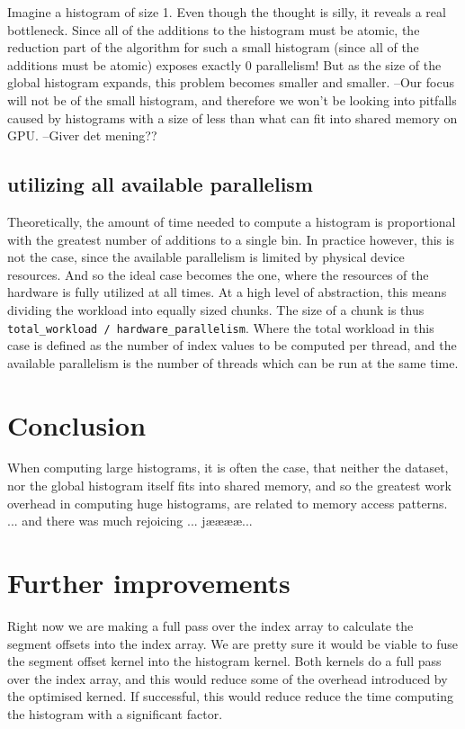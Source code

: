 \documentclass[12pt, a4paper, hidelinks]{article}
\renewcommand{\tt}[1]{\texttt{#1}}
\begin{document}
Imagine a histogram of size 1. Even though the thought is silly,
it reveals a real bottleneck. Since all of the additions to the
histogram must be atomic, the reduction part of the algorithm for
such a small histogram (since all of the additions must be atomic)
exposes exactly 0 parallelism! But as the size of the global histogram
expands, this problem becomes smaller and smaller.
--Our focus will not be of the small histogram, and therefore we won’t be
looking into pitfalls caused by histograms with a size of less than what
can fit into shared memory on GPU. --Giver det mening??

\subsection{utilizing all available parallelism}
Theoretically, the amount of time needed to compute a histogram is
proportional with the greatest number of additions to a single bin.
In practice however, this is not the case,
since the available parallelism is limited by physical device resources.
And so the ideal case becomes the one,
where the resources of the hardware is fully utilized at all times.
At a high level of abstraction, this means dividing the workload into
equally sized chunks. The size of a chunk is thus
\tt{total\_workload / hardware\_parallelism}.
Where the total workload in this case is defined as the number of index values
to be computed per thread, and the available parallelism is the number of
threads which can be run at the same time.

\section{Conclusion}
When computing large histograms,
it is often the case, that neither the dataset,
nor the global histogram itself fits into shared memory,
and so the greatest work overhead in computing huge histograms,
are related to memory access patterns. ... and there was much rejoicing ... jææææ...

\section{Further improvements}
Right now we are making a full pass over the index array to calculate
the segment offsets into the index array.
We are pretty sure it would be viable to fuse the segment offset
kernel into the histogram kernel.
Both kernels do a full pass over the index array,
and this would reduce some of the overhead introduced
by the optimised kerned. If successful,
this would reduce reduce the time computing the histogram with a significant factor.


\end{document}
